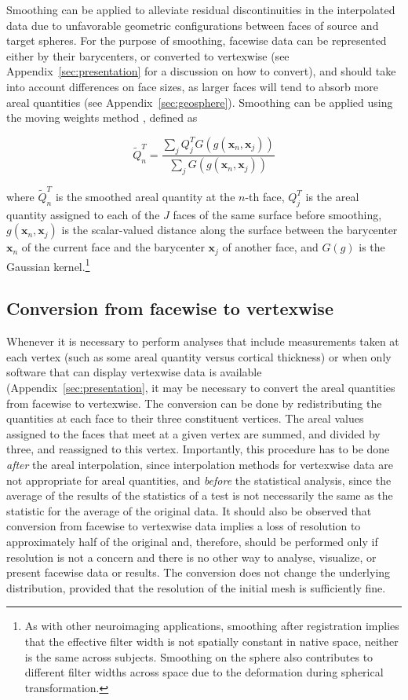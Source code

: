 Smoothing can be applied to alleviate residual discontinuities in the interpolated data due to unfavorable geometric configurations between faces of source and target spheres. For the purpose of smoothing, facewise data can be represented either by their barycenters, or converted to vertexwise (see Appendix~\ref{sec:presentation} for a discussion on how to convert), and should take into account differences on face sizes, as larger faces will tend to absorb more areal quantities (see Appendix~\ref{sec:geosphere}). Smoothing can be applied using the moving weights method \citep{Lombardi2002}, defined as

\begin{equation}
\tilde{Q}^{T}_n = \frac{\sum_j Q^{T}_j G(g(\mathbf{x}_n,\mathbf{x}_j))}{\sum_j G(g(\mathbf{x}_n,\mathbf{x}_j))}
\end{equation}

\noindent where $\tilde{Q}^{T}_n$ is the smoothed areal quantity at the $n$-th face, $Q^{T}_j$ is the areal quantity assigned to each of the $J$ faces of the same surface before smoothing, $g(\mathbf{x}_n,\mathbf{x}_j)$ is the scalar-valued distance along the surface between the barycenter $\mathbf{x}_n$ of the current face and the barycenter $\mathbf{x}_j$ of another face, and $G(g)$ is the Gaussian kernel.\footnote{As with other neuroimaging applications, smoothing after registration implies that the effective filter width is not spatially constant in native space, neither is the same across subjects. Smoothing on the sphere also contributes to different filter widths across space due to the deformation during spherical transformation.}

\subsection{Conversion from facewise to vertexwise}
\label{sec:conversion}

Whenever it is necessary to perform analyses that include measurements taken at each vertex (such as some areal quantity versus cortical thickness) or when only software that can display vertexwise data is available (Appendix~\ref{sec:presentation}, it may be necessary to convert the areal quantities from facewise to vertexwise. The conversion can be done by redistributing the quantities at each face to their three constituent vertices. The areal values assigned to the faces that meet at a given vertex are summed, and divided by three, and reassigned to this vertex. Importantly, this procedure has to be done \emph{after} the areal interpolation, since interpolation methods for vertexwise data are not appropriate for areal quantities, and \emph{before} the statistical analysis, since the average of the results of the statistics of a test is not necessarily the same as the statistic for the average of the original data. It should also be observed that conversion from facewise to vertexwise data implies a loss of resolution to approximately half of the original and, therefore, should be performed only if resolution is not a concern and there is no other way to analyse, visualize, or present facewise data or results. The conversion does not change the underlying distribution, provided that the resolution of the initial mesh is sufficiently fine.

